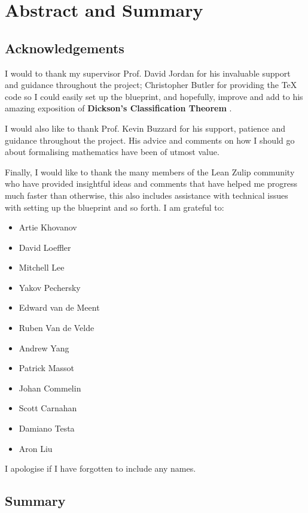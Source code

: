 \chapter{Abstract and Summary}\label{Ch1_AbstractAndAcknowledgements}

\section{Acknowledgements}

I would to thank my supervisor Prof. David Jordan for his invaluable support and guidance throughout the project;
Christopher Butler for providing the TeX code so I could easily set up the blueprint, and hopefully, improve and add to his amazing exposition of
\textbf{Dickson's Classification Theorem} \cite{butler}.

I would also like to thank Prof. Kevin Buzzard for his support, patience and guidance throughout the project. His advice and comments on how I should go about formalising mathematics have been of utmost value. 

Finally, I would like to thank the many members of the Lean Zulip community who have provided insightful ideas and comments that have helped me progress much faster than otherwise, 
this also includes assistance with technical issues with setting up the blueprint and so forth. I am grateful to:

\begin{itemize}
    \item Artie Khovanov
    \item David Loeffler
    \item Mitchell Lee
    \item Yakov Pechersky
    \item Edward van de Meent
    \item Ruben Van de Velde
    \item Andrew Yang
    \item Patrick Massot
    \item Johan Commelin
    \item Scott Carnahan
    \item Damiano Testa
    \item Aron Liu
\end{itemize}

I apologise if I have forgotten to include any names.

\section{Summary}

